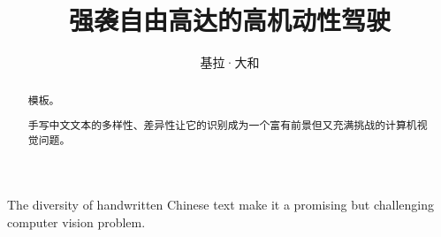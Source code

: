 \documentclass[winfonts, thesis]{njuthesis}
\title{强袭自由高达的高机动性驾驶}
\author{基拉·大和}
\begin{document}
\maketitle

\begin{abstract}
  模板。

  手写中文文本的多样性、差异性让它的识别成为一个富有前景但又充满挑战的计算机视觉问题。

\end{abstract}

\begin{englishabstract}
  The diversity of handwritten Chinese text make it a promising but challenging computer vision problem.
\end{englishabstract}

%
%
%
%

\tableofcontents



\mainmatter
\end{document}
